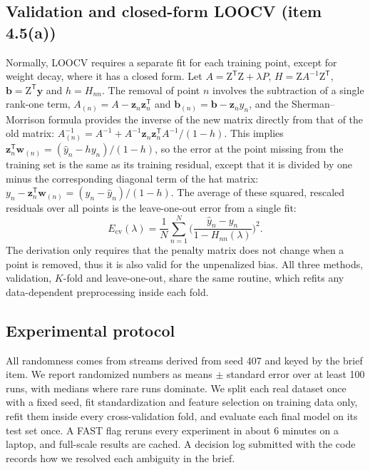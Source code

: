 \documentclass[conference]{IEEEtran}
\newcommand{\w}{\mathbf{w}}
\newcommand{\Z}{\mathrm{Z}}
\newcommand{\y}{\mathbf{y}}
\newcommand{\T}{^{\mathsf T}}
\begin{document}
\subsection{Validation and closed-form LOOCV (item 4.5(a))}
Normally, LOOCV requires a separate fit for each training point, except for weight decay, where it has a closed form. Let $A=\Z\T\Z+\lambda P$, $H=\Z A^{-1}\Z\T$, $\mathbf b=\Z\T\y$ and $h=H_{nn}$. The removal of point $n$ involves the subtraction of a single rank-one term, $A_{(n)}=A-\mathbf z_n\mathbf z_n\T$ and $\mathbf b_{(n)}=\mathbf b-\mathbf z_ny_n$, and the Sherman--Morrison formula provides the inverse of the new matrix directly from that of the old matrix: $A_{(n)}^{-1}=A^{-1}+A^{-1}\mathbf z_n\mathbf z_n\T A^{-1}/(1-h)$. This implies $\mathbf z_n\T\w_{(n)}=(\hat y_n-hy_n)/(1-h)$, so the error at the point missing from the training set is the same as its training residual, except that it is divided by one minus the corresponding diagonal term of the hat matrix: $y_n-\mathbf z_n\T\w_{(n)}=(y_n-\hat y_n)/(1-h)$. The average of these squared, rescaled residuals over all points is the leave-one-out error from a single fit:
\begin{equation}
E_{\mathrm{cv}}(\lambda)=\frac1N\sum_{n=1}^N\Big(\frac{\hat y_n-y_n}{1-H_{nn}(\lambda)}\Big)^2.\label{eq:loocv}
\end{equation}
The derivation only requires that the penalty matrix does not change when a point is removed, thus it is also valid for the unpenalized bias. All three methods, validation, $K$-fold and leave-one-out, share the same routine, which refits any data-dependent preprocessing inside each fold.

\subsection{Experimental protocol}
All randomness comes from streams derived from seed 407 and keyed by the brief item. We report randomized numbers as means $\pm$ standard error over at least 100 runs, with medians where rare runs dominate. We split each real dataset once with a fixed seed, fit standardization and feature selection on training data only, refit them inside every cross-validation fold, and evaluate each final model on its test set once. A FAST flag reruns every experiment in about 6 minutes on a laptop, and full-scale results are cached. A decision log submitted with the code records how we resolved each ambiguity in the brief.

\end{document}
